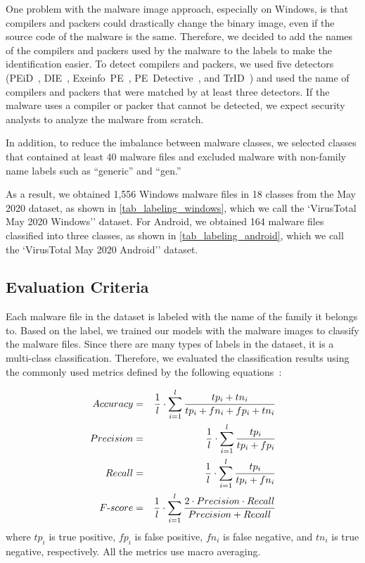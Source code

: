\documentclass[conference]{IEEEtran}
\begin{document}
One problem with the malware image approach, especially on Windows, is that compilers and packers could drastically change the binary image, even if the source code of the malware is the same.
Therefore, we decided to add the names of the compilers and packers used by the malware to the labels to make the identification easier.
To detect compilers and packers, we used five detectors (PEiD~\cite{PEiD}, DIE~\cite{DIE}, Exeinfo\ PE~\cite{ExeinfoPE}, PE\ Detective~\cite{PEDetective}, and TrID~\cite{TrID}) and used the name of compilers and packers that were matched by at least three detectors.
If the malware uses a compiler or packer that cannot be detected, we expect security analysts to analyze the malware from scratch.

In addition, to reduce the imbalance between malware classes, we selected classes that contained at least 40 malware files and excluded malware with non-family name labels such as ``generic'' and ``gen.''

As a result, we obtained 1,556 Windows malware files in 18 classes from the May 2020 dataset, as shown in \autoref{tab_labeling_windows}, which we call the `VirusTotal May 2020 Windows'' dataset.
For Android, we obtained 164 malware files classified into three classes, as shown in \autoref{tab_labeling_android}, which we call the `VirusTotal May 2020 Android'' dataset.

\subsection{Evaluation Criteria}

Each malware file in the dataset is labeled with the name of the family it belongs to.
Based on the label, we trained our models with the malware images to classify the malware files.
Since there are many types of labels in the dataset, it is a multi-class classification.
Therefore, we evaluated the classification results using the commonly used metrics defined by the following equations~\cite{sokolova2009systematic}: 

\begin{eqnarray*}
  Accuracy &=& \frac{1}{l}\cdot\sum^{l}_{i=1}\frac{tp_{i}+tn_{i}}{tp_{i}+fn_{i}+fp_{i}+tn_{i}} \\
  Precision &=& \frac{1}{l} \cdot \sum^{l}_{i=1} \frac {tp_{i}} {tp_{i}+fp_{i}} \\
  Recall &=& \frac{1}{l} \cdot \sum^{l}_{i=1} \frac {tp_{i}} {tp_{i}+fn_{i}}  \\
  F\mathchar`-score &=& \frac{1}{l} \cdot \sum^{l}_{i=1} \frac {2 \cdot Precision \cdot Recall}{Precision + Recall} \\
\end{eqnarray*}
where $ tp_{i}$ is true positive, 
$fp_{i}$ is false positive,
$fn_{i}$ is false negative, and
$tn_{i}$ is true negative, respectively.
All the metrics use macro averaging.
\end{document}
